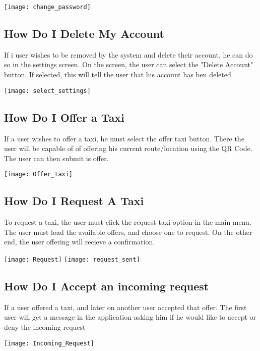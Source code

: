 \documentclass[english]{article}
\begin{document}
\texttt{[image: change\_password]}

\subsection{How Do I Delete My Account}

If i user wishes to be removed by the system and delete their account, he can do so in the settings screen. On the screen, the user can select the "Delete Account" button. If selected, this will tell the user that his account has ben deleted


\texttt{[image: select\_settings]}

\subsection{How Do I Offer a Taxi}

If a user wishes to offer a taxi, he must select the offer taxi button. There the user will be capable of of offering his current route/location using the QR Code. The user can then submit is offer.

\texttt{[image: Offer\_taxi]}

\subsection{How Do I Request A Taxi}

To request a taxi, the user must click the request taxi option in the main menu. The user must load the available offers, and choose one to request. On the other end, the user offering will recieve a confirmation. 

\texttt{[image: Request]}
\texttt{[image: request\_sent]}

\subsection{How Do I Accept an incoming request}

If a user offered a taxi, and later on another user accepted that offer. The first user will get a message in the application asking him if he would like to accept or deny the incoming request

\texttt{[image: Incoming\_Request]}
\end{document}
